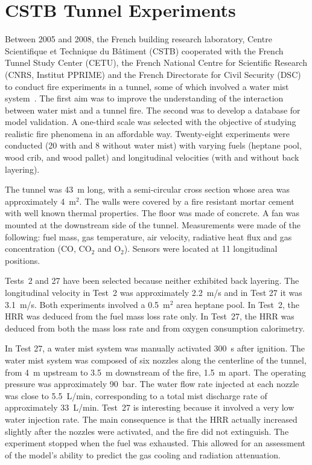\begin{table}
\begin{center}
\begin{tabular}{|l|c|c|c|}
\end{tabular}
\end{center}
\end{table}


\section{CSTB Tunnel Experiments}

Between 2005 and 2008, the French building research laboratory, Centre Scientifique et Technique du B\^{a}timent (CSTB) cooperated with the French Tunnel Study Center (CETU), the French National Centre for Scientific Research (CNRS, Institut PPRIME) and the French Directorate for Civil Security (DSC) to conduct fire experiments in a tunnel, some of which involved a water mist system~\cite{Meyrand,Blanchard:FT2014}. The first aim was to improve the understanding of the interaction between water mist and a tunnel fire.  The second was to develop a database for model validation. A one-third scale was selected with the objective of studying realistic fire phenomena in an affordable way.  Twenty-eight experiments were conducted (20 with and 8 without water mist) with varying fuels (heptane pool, wood crib, and wood pallet) and longitudinal velocities (with and without back layering).

The tunnel was 43~m long, with a semi-circular cross section whose area was approximately 4~m$^2$. The walls were covered by a fire resistant mortar cement with well known thermal properties. The floor was made of concrete. A fan was mounted at the downstream side of the tunnel.  Measurements were made of the following: fuel mass, gas temperature, air velocity, radiative heat flux and gas concentration (CO, CO$_2$ and O$_2$).  Sensors were located at 11 longitudinal positions.

Tests~2 and 27 have been selected because neither exhibited back layering. The longitudinal velocity in Test~2 was approximately 2.2~m/s and in Test 27 it was 3.1~m/s. Both experiments involved a 0.5~m$^2$ area heptane pool. In Test~2, the HRR was deduced from the fuel mass loss rate only.  In Test~27, the HRR was deduced from both the mass loss rate and from oxygen consumption calorimetry.

In Test 27, a water mist system was manually activated 300~s after ignition. The water mist system was composed of six nozzles along the centerline of the tunnel, from 4~m upstream to 3.5~m downstream of the fire, 1.5~m apart.  The operating pressure was approximately 90~bar. The water flow rate injected at each nozzle was close to 5.5~L/min, corresponding to a total mist discharge rate of approximately 33~L/min.  Test~27 is interesting because it involved a very low water injection rate.  The main consequence is that the HRR actually increased slightly after the nozzles were activated, and the fire did not extinguish.  The experiment stopped when the fuel was exhausted. This allowed for an assessment of the model's ability to predict the gas cooling and radiation attenuation.

